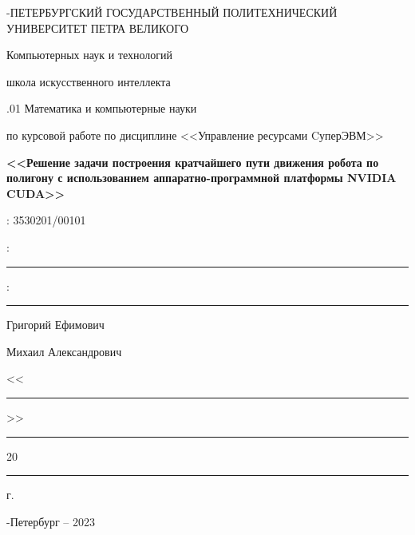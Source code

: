 \documentclass[a4paper, 12pt]{article}
\begin{document}
	
	\thispagestyle{empty}
	\begin{center}
		
		{-ПЕТЕРБУРГСКИЙ ГОСУДАРСТВЕННЫЙ ПОЛИТЕХНИЧЕСКИЙ УНИВЕРСИТЕТ ПЕТРА ВЕЛИКОГО}
		
		\vspace{0.2cm}
		{ Компьютерных наук и технологий}
		
		\vspace{0.2cm}
		{ школа искусственного интеллекта}
		
		\vspace{0.2cm}
		{.01 Математика и компьютерные науки} 
		
		\vspace{5cm}
		{ по курсовой работе по дисциплине <<Управление ресурсами CуперЭВМ>>}
		
		\vspace{0.5cm}
		{\large\textbf{<<Решение задачи построения кратчайшего пути движения робота по полигону с использованием аппаратно-программной платформы NVIDIA CUDA>>}}

		\vspace{0.5cm}
		{: 3530201/00101}
	
	\end{center}
	
	\vspace{5cm}
	\parbox{9cm}{
		{:}\hspace{1.9cm}\rule{3cm}{1pt} 
		
		\vspace{2cm}
		{:}\hspace{0.5cm}\rule{3cm}{1pt} 
	}
	\parbox{9cm}{
	{ Григорий Ефимович}
	
	\vspace{2cm}
	{ Михаил Александрович}
	}

	\vspace{2cm}
	\begin{flushright}
		{\large{<<}\rule{0.75cm}{1pt}{>>}\rule{3cm}{1pt} {20}\rule{0.75cm}{1pt} {г.}}
	\end{flushright}
	
	\vspace{1.25cm}	
	\begin{center}
		{-Петербург -- 2023}
	\end{center}
	
\end{document}
